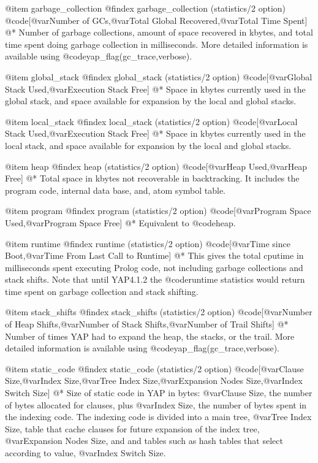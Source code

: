 {{{{{{@item garbage_collection
@findex garbage_collection (statistics/2 option)
@code{[@var{Number of GCs},@var{Total Global Recovered},@var{Total Time
Spent}]}
@*
Number of garbage collections, amount of space recovered in kbytes, and
total time spent doing garbage collection in milliseconds. More detailed
information is available using @code{yap_flag(gc_trace,verbose)}.

@item global_stack
@findex global_stack (statistics/2 option)
@code{[@var{Global Stack Used},@var{Execution Stack Free}]}
@*
Space in kbytes currently used in the global stack, and space available for
expansion by the local and global stacks.

@item local_stack
@findex local_stack (statistics/2 option)
@code{[@var{Local Stack Used},@var{Execution Stack Free}]}
@*
Space in kbytes currently used in the local stack, and space available for
expansion by the local and global stacks.

@item heap
@findex heap (statistics/2 option)
@code{[@var{Heap Used},@var{Heap Free}]}
@*
Total space in kbytes not recoverable
in backtracking. It includes the program code, internal data base, and,
atom symbol table.

@item program
@findex program (statistics/2 option)
@code{[@var{Program Space Used},@var{Program Space Free}]}
@*
Equivalent to @code{heap}.

@item runtime
@findex runtime (statistics/2 option)
@code{[@var{Time since Boot},@var{Time From Last Call to Runtime}]}
@* 
This gives the total cputime in milliseconds spent executing Prolog
code, not including garbage collections and stack shifts. Note that
until YAP4.1.2 the @code{runtime} statistics would return time spent on
garbage collection and stack shifting.

@item stack_shifts
@findex stack_shifts (statistics/2 option)
@code{[@var{Number of Heap Shifts},@var{Number of Stack
Shifts},@var{Number of Trail Shifts}]}
@*
Number of times YAP had to
expand the heap, the stacks, or the trail. More detailed information is
available using @code{yap_flag(gc_trace,verbose)}.

@item static_code
@findex static_code (statistics/2 option)
@code{[@var{Clause Size},@var{Index Size},@var{Tree Index
Size},@var{Expansion Nodes Size},@var{Index Switch Size}]}
@*
Size of static code in YAP in bytes: @var{Clause Size}, the number of
bytes allocated for clauses, plus
@var{Index Size}, the number of bytes spent in the indexing code. The
indexing code is divided into a main tree, @var{Tree Index
Size}, table that cache clauses for future expansion of the index
tree, @var{Expansion Nodes Size}, and and 
tables such as hash tables that select according to value,  @var{Index Switch Size}.

}}}}}}
